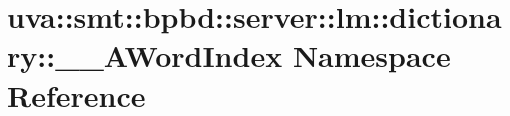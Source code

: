 \hypertarget{namespaceuva_1_1smt_1_1bpbd_1_1server_1_1lm_1_1dictionary_1_1_____a_word_index}{}\section{uva\+:\+:smt\+:\+:bpbd\+:\+:server\+:\+:lm\+:\+:dictionary\+:\+:\+\_\+\+\_\+\+A\+Word\+Index Namespace Reference}
\label{namespaceuva_1_1smt_1_1bpbd_1_1server_1_1lm_1_1dictionary_1_1_____a_word_index}
